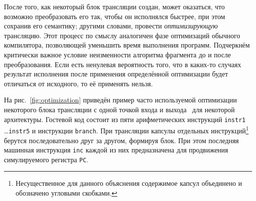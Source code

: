 После того, как некоторый блок трансляции создан, может оказаться, что возможно преобразовать его так, чтобы он исполнялся быстрее, при этом сохранив его семантику; другими словами, провести \emph{оптимизирующую} трансляцию. Этот процесс по смыслу аналогичен фазе оптимизаций обычного компилятора, позволяющей уменьшить время выполнения программ. Подчеркнём критически важное условие неизменности алгоритма фрагмента до и после преобразования. Если есть ненулевая вероятность того, что в каких-то случаях результат исполнения после применения определённой оптимизации будет отличаться от исходного, то её применять нельзя.

На рис.~\ref{fig:optimization} приведён пример часто используемой оптимизации некоторого блока трансляции с одной точкой входа и выхода~\cite{helmstetter2011} для некоторой архитектуры. Гостевой код состоит из пяти арифметических инструкций \texttt{instr1} \dots \texttt{instr5} и инструкции \texttt{branch}. При трансляции капсулы отдельных инструкций\footnote{Несущественное для данного объяснения содержимое капсул объединено и обозначено угловыми скобками.} берутся последовательно друг за другом, формируя блок. При этом последняя машинная инструкция \texttt{inc} каждой из них предназначена для продвижения симулируемого регистра \texttt{PC}. 

